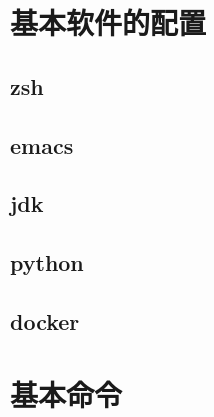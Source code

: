 \documentclass[UTF8]{ctexart}
\begin{document}
\section{基本软件的配置}
\subsection{zsh}
\subsection{emacs}
\subsection{jdk}
\subsection{python}
\subsection{docker}
\section{基本命令}
\end{document}
